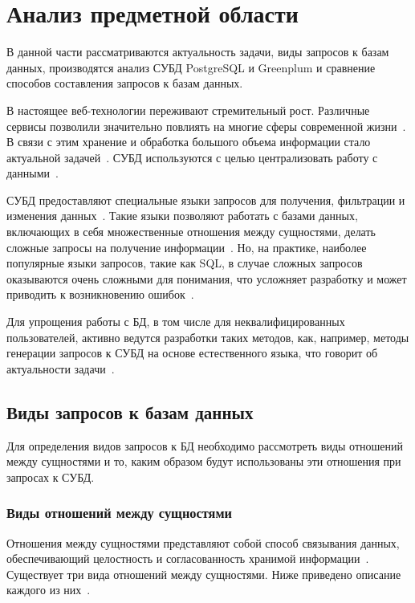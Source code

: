 \chapter{Анализ предметной области}

В данной части рассматриваются актуальность задачи, виды запросов к базам данных, производятся анализ СУБД PostgreSQL и Greenplum и сравнение способов составления запросов к базам данных.


В настоящее веб-технологии переживают стремительный рост. Различные сервисы позволили значительно повлиять на многие сферы современной жизни~\cite{murodilov2023web}. В связи с этим хранение и обработка большого объема информации стало актуальной задачей~\cite{картавец2019актуальность}. СУБД используются с целью централизовать работу с данными~\cite{стасышин2022проектирование}.

СУБД предоставляют специальные языки запросов для получения, фильтрации и изменения данных~\cite{song2023testing}. Такие языки позволяют работать с базами данных, включающих в себя множественные отношения между сущностями, делать сложные запросы на получение информации~\cite{hohenstein1992sql}. Но, на практике, наиболее популярные языки запросов, такие как SQL, в случае сложных запросов оказываются очень сложными для понимания, что усложняет разработку и может приводить к возникновению ошибок~\cite{date2011sql}.

Для упрощения работы с БД, в том числе для неквалифицированных пользователей, активно ведутся разработки таких методов, как, например,  методы генерации запросов к СУБД на основе естественного языка, что говорит об актуальности задачи~\cite{fu2023catsql,naik2023sql,sun2023sql}.


\section{Виды запросов к базам данных}

Для определения видов запросов к БД необходимо рассмотреть виды отношений между сущностями и то, каким образом будут использованы эти отношения при запросах к СУБД.

\subsection{Виды отношений между сущностями}

Отношения между сущностями представляют собой способ связывания данных, обеспечивающий целостность и согласованность хранимой информации~\cite{чаглей2023сравнение}. Существует три вида отношений между сущностями. Ниже приведено описание каждого из них~\cite{стасышин2022проектирование}.

